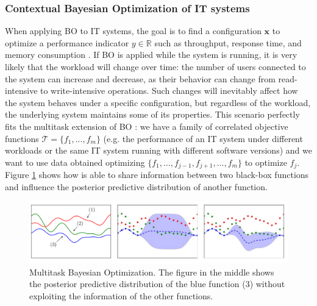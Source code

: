 \documentclass[a4paper, 12pt]{article} %
\begin{document}
	\subsubsection{Contextual Bayesian Optimization of IT systems} \label{ssec:contextual_bayesian_optimization}
	
	When applying BO to IT systems, the goal is to find a configuration $\pmb{x}$ to optimize a performance indicator $y \in \mathbb{R}$ such as throughput, response time, and memory consumption \cite{AkamasCGP}. If BO is applied while the system is running, it is very likely that the workload will change over time: the number of users connected to the system can increase and decrease, as their behavior can change from read-intensive to write-intensive operations. Such changes will inevitably affect how the system behaves under a specific configuration, but regardless of the workload, the underlying system maintains some of its properties. 
	This scenario perfectly fits the multitask extension of BO \cite{CGPBanditOptimization}: we have a family of correlated objective functions $\mathcal{T}=\{f_1, ..., f_m\}$ (e.g. the performance of an IT system under different workloads or the same IT system running with different software versions) and we want to use data obtained optimizing $\{f_1, ..., f_{j-1}, f_{j+1}, ..., f_m\}$ to optimize $f_j$. Figure \ref{fig:multitask_bo} shows how \cite{CGPBanditOptimization} is able to share information between two black-box functions and influence the posterior predictive distribution of another function.
	
	\begin{figure} 
		\includegraphics[width=\linewidth]{img/multitask_bo.png}
		\caption{Multitask Bayesian Optimization. The figure in the middle shows the posterior predictive distribution of the blue function (3) without exploiting the information of the other functions.} \label{fig:multitask_bo}
	\end{figure}
	
\end{document}
